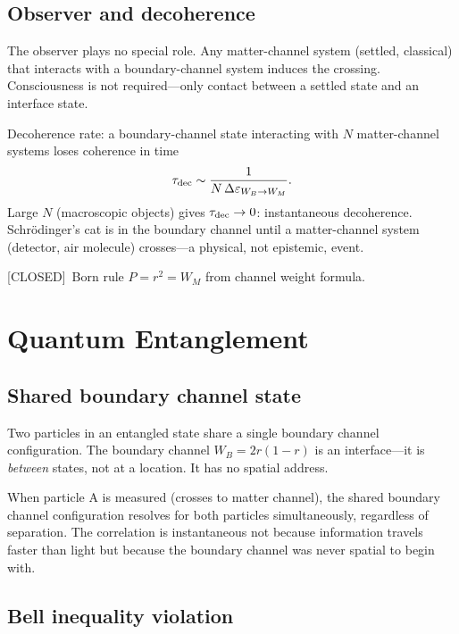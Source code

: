 \documentclass[prd,twocolumn,preprintnumbers,amsmath,amssymb]{revtex4-2}
\newcommand{\closed}{\textcolor{green!60!black}{[CLOSED]}}
\begin{document}
\subsection{Observer and decoherence}

The observer plays no special role.  Any matter-channel system
(settled, classical) that interacts with a boundary-channel system
induces the crossing.  Consciousness is not required---only contact
between a settled state and an interface state.

Decoherence rate: a boundary-channel state interacting with $N$
matter-channel systems loses coherence in time
\begin{equation}
  \tau_{\rm dec} \sim \frac{1}{N\,\Delta\varepsilon_{W_B \to W_M}}.
  \label{eq:decohere}
\end{equation}
Large $N$ (macroscopic objects) gives $\tau_{\rm dec} \to 0$:
instantaneous decoherence.  Schr\"{o}dinger's cat is in the boundary
channel until a matter-channel system (detector, air molecule)
crosses---a physical, not epistemic, event.

\closed\ Born rule $P = r^2 = W_M$ from channel weight formula.

\section{Quantum Entanglement}
\label{sec:entanglement}

\subsection{Shared boundary channel state}

Two particles in an entangled state share a single boundary channel
configuration.  The boundary channel $W_B = 2r(1-r)$ is an
interface---it is \emph{between} states, not at a location.  It has
no spatial address.

When particle A is measured (crosses to matter channel), the shared
boundary channel configuration resolves for both particles
simultaneously, regardless of separation.  The correlation is
instantaneous not because information travels faster than light but
because the boundary channel was never spatial to begin with.

\subsection{Bell inequality violation}
\end{document}
